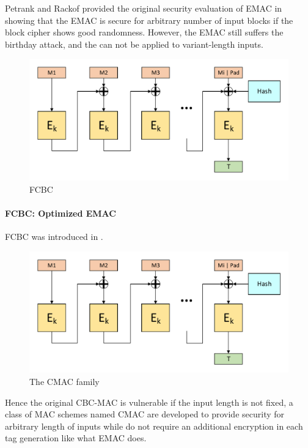 \documentclass{article}
\begin{document}
Petrank and Rackof provided the original security evaluation of EMAC in \cite{emac} showing that the EMAC is secure for arbitrary number of input blocks if the block cipher shows good randomness. However, the EMAC still suffers the birthday attack, and the can not be applied to variant-length inputs.

\begin{figure}[htbp]
\centering
\includegraphics[scale=0.5]{./diagrams/cmac.pdf}
\caption{FCBC}
\label{fig:FCBC}
\end{figure}
\paragraph{FCBC: Optimized EMAC}
FCBC was introduced in \cite{}.

\begin{figure}[htbp]
\centering
\includegraphics[scale=0.5]{./diagrams/cmac.pdf}
\caption{The CMAC family}
\label{fig:XCBC}
\end{figure}
Hence the original CBC-MAC is vulnerable if the input length is not fixed, a class of MAC schemes named CMAC are developed to provide security for arbitrary length of inputs while do not require an additional encryption in each tag generation like what EMAC does. 
\end{document}
